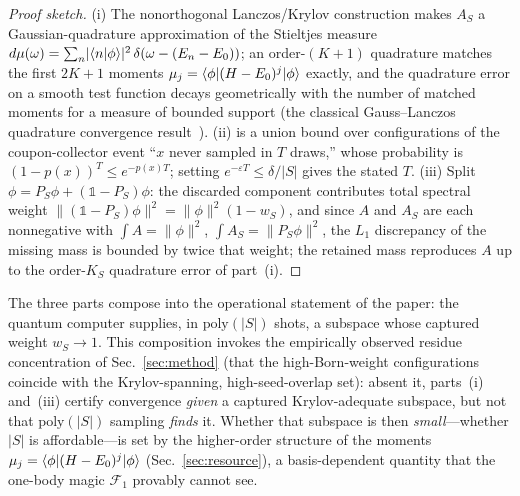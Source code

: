 \begin{proof}[Proof sketch]
(i) The nonorthogonal Lanczos/Krylov construction makes $A_S$ a Gaussian-quadrature approximation
of the Stieltjes measure $d\mu(\omega)=\sum_n\lvert\langle n|\phi \rangle\rvert^2\,\delta(\omega-(E_n-E_0))$;
an order-$(K{+}1)$ quadrature matches the first $2K+1$ moments
$\mu_j=\langle \phi|(H-E_0)^{j}|\phi \rangle$ exactly, and the quadrature error on a smooth test function decays
geometrically with the number of matched moments for a measure of bounded support (the classical
Gauss--Lanczos quadrature convergence result~\cite{golub2010}). (ii) is a union bound over configurations of the
coupon-collector event ``$x$ never sampled in $T$ draws,'' whose probability is $(1-p(x))^T\le
e^{-p(x)T}$; setting $e^{-\varepsilon T}\le\delta/|S|$ gives the stated $T$. (iii) Split
$\phi=P_S\phi+(\mathbb{1}-P_S)\phi$: the discarded component contributes total spectral weight
$\lVert(\mathbb{1}-P_S)\phi\rVert^{2}=\lVert\phi\rVert^{2}(1-w_S)$, and since $A$ and $A_S$ are each
nonnegative with $\int A=\lVert\phi\rVert^2$, $\int A_S=\lVert P_S\phi\rVert^2$, the $L_1$ discrepancy
of the missing mass is bounded by twice that weight; the retained mass reproduces $A$ up to the
order-$K_S$ quadrature error of part~(i).
\end{proof}

The three parts compose into the operational statement of the paper: the quantum computer supplies,
in $\mathrm{poly}(|S|)$ shots, a subspace whose captured weight $w_S\to1$. This composition invokes the
empirically observed residue concentration of Sec.~\ref{sec:method} (that the high-Born-weight
configurations coincide with the Krylov-spanning, high-seed-overlap set): absent it, parts~(i) and~(iii)
certify convergence \emph{given} a captured Krylov-adequate subspace, but not that $\mathrm{poly}(|S|)$
sampling \emph{finds} it. Whether that subspace is then
\emph{small}---whether $|S|$ is affordable---is set by the higher-order structure of the moments
$\mu_{j}=\langle \phi|(H-E_0)^{j}|\phi \rangle$ (Sec.~\ref{sec:resource}), a basis-dependent quantity that the
one-body magic $\mathcal F_1$ provably cannot see.

